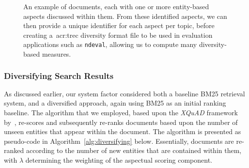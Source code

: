 \begin{figure}[t!]
    \centering
    \caption[Entity-based aspects example]{An example of documents, each with one or more entity-based aspects discussed within them. From these identified aspects, we can then provide a unique identifier for each aspect per topic, before creating a~\gls{acr:trec} diversity format file to be used in evaluation applications such as \texttt{ndeval}, allowing us to compute many diversity-based measures.}
    \label{fig:entity_ids}
\end{figure}

\subsubsection{Diversifying Search Results}\label{sec:diversity:users:diversifying}
As discussed earlier, our system factor considered both a baseline BM25 retrieval system, and a diversified approach, again using BM25 as an initial ranking baseline. The algorithm that we employed, based upon the \emph{XQuAD} framework by~\cite{santos2010query_reformulations_diversification}, re-scores and subsequently re-ranks documents based upon the number of unseen entities that appear within the document. The algorithm is presented as pseudo-code in Algorithm~\ref{alg:diversifying} below. Essentially, documents are re-ranked according to the number of new entities that are contained within them, with $\lambda$ determining the weighting of the aspectual scoring component.

